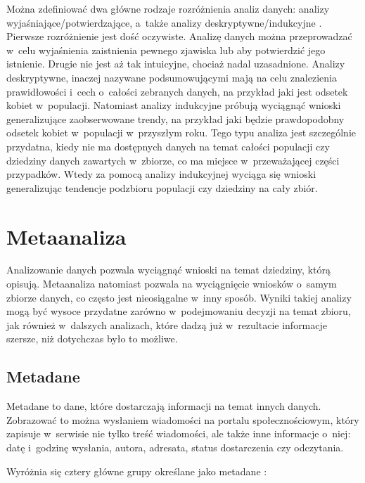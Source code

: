 	Można zdefiniować dwa główne rodzaje rozróżnienia analiz danych: analizy wyjaśniające/potwierdzające, a~także analizy deskryptywne/indukcyjne \cite{berthold2003intelligent}.
	Pierwsze rozróżnienie jest dość oczywiste.
	Analizę danych można przeprowadzać w~celu wyjaśnienia zaistnienia pewnego zjawiska lub aby potwierdzić jego istnienie.
	Drugie nie jest aż tak intuicyjne, chociaż nadal uzasadnione.
	Analizy deskryptywne, inaczej nazywane podsumowującymi mają na celu znalezienia prawidłowości i~cech o~całości zebranych danych, na przykład jaki jest odsetek kobiet w~populacji.
	Natomiast analizy indukcyjne próbują wyciągnąć wnioski generalizujące zaobserwowane trendy, na przykład jaki będzie prawdopodobny odsetek kobiet w~populacji w~przyszłym roku.
	Tego typu analiza jest szczególnie przydatna, kiedy nie ma dostępnych danych na temat całości populacji czy dziedziny danych zawartych w~zbiorze, co ma miejsce w~przeważającej części przypadków.
	Wtedy za pomocą analizy indukcyjnej wyciąga się wnioski generalizując tendencje podzbioru populacji czy dziedziny na cały zbiór.

\section{Metaanaliza}

	Analizowanie danych pozwala wyciągnąć wnioski na temat dziedziny, którą opisują.
	Metaanaliza natomiast pozwala na wyciągnięcie wniosków o~samym zbiorze danych, co często jest nieosiągalne w~inny sposób.
	Wyniki takiej analizy mogą być wysoce przydatne zarówno w~podejmowaniu decyzji na temat zbioru, jak również w~dalszych analizach, które dadzą już w~rezultacie informacje szersze, niż dotychczas było to możliwe.

	\subsection{Metadane}

	Metadane to dane, które dostarczają informacji na temat innych danych.
	Zobrazować to można wysłaniem wiadomości na portalu społecznościowym, który zapisuje w~serwisie nie tylko treść wiadomości, ale także inne informacje o~niej: datę i~godzinę wysłania, autora, adresata, status dostarczenia czy odczytania.

	Wyróżnia się cztery główne grupy określane jako metadane \cite{riley2017understanding}:

